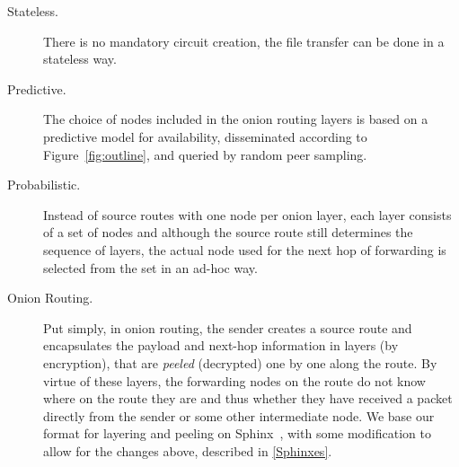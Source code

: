 \begin{description}
\item [Stateless.] There is no mandatory circuit creation, the file transfer can be
  done in a stateless way. 
\item [Predictive.] The choice of nodes included in the onion routing
  layers is based on a predictive model for availability, disseminated
  according to Figure~\cref{fig:outline}, and queried by random peer sampling.
\item [Probabilistic.] Instead of source routes with one node per onion layer, each
  layer consists of a set of nodes and although the source route still
  determines the sequence of layers, the actual node used for the next
  hop of forwarding is selected from the set in an ad-hoc way.
\item[Onion Routing.] Put simply, in onion routing, the sender creates
  a source route and 
  encapsulates the payload and next-hop information in layers (by
  encryption), that are \emph{peeled} (decrypted) one by one along the
  route. By virtue of these layers, the forwarding nodes on the
  route do not know where on the route they are and thus whether they
  have received a packet directly from the sender or some other
  intermediate node. We base our format for layering and peeling on
  Sphinx~\cite{Sphinx}, with some modification to allow for the
  changes above, described in \cref{Sphinxes}.
\end{description} 

